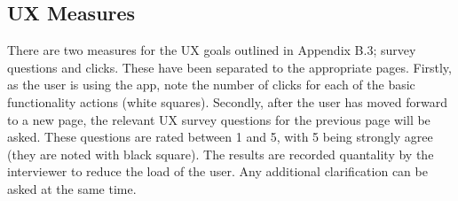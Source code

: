 \documentclass[a4 paper, 10pt]{article}
\begin{document}
    \subsection*{UX Measures}
    There are two measures for the UX goals outlined in Appendix B.3; survey questions and clicks. These have been separated to the appropriate pages. Firstly, as the user is using the app, note the number of clicks for each of the basic functionality actions (white squares). Secondly, after the user has moved forward to a new page, the relevant UX survey questions for the previous page will be asked. These questions are rated between 1 and 5, with 5 being strongly agree (they are noted with black square). The results are recorded quantality by the interviewer to reduce the load of the user. Any additional clarification can be asked at the same time. 
\end{document}
